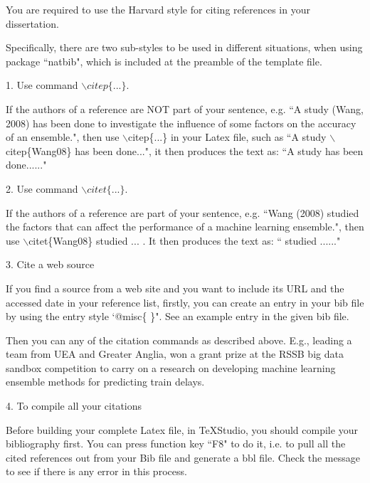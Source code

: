 You are required to use the Harvard style for citing references in your dissertation.

Specifically, there are two sub-styles to be used in different situations, when using package ``natbib", which is included at the preamble of the template file.

1. Use command $\backslash citep\{...\}$. 

If the authors of a reference are NOT part of your sentence, e.g. ``A study (Wang, 2008) has been done to investigate the influence of some factors on the accuracy of an ensemble.", then use $\backslash$citep\{...\} in your Latex file, such as ``A study $\backslash$citep\{Wang08\} has been done...", it then produces the text as: 
``A study \citep{Wang08} has been done......"

2. Use command $\backslash citet\{...\}$.

If the authors of a reference are part of your sentence, e.g. ``Wang (2008) studied the factors that can affect the performance of a machine learning ensemble.", then use $\backslash$citet\{Wang08\} studied ... . It then produces the text as: `` \citet{Wang08} studied ......" 

3. Cite a web source

If you find a source from a web site and you want to include its URL and the accessed date in your reference list, firstly, you can create an entry in your bib file by using the entry style  `@misc\{ \}". See an example entry in the given bib file.


Then you can any of the citation commands as described above. E.g.\citet{Wang_TrainDelayPrediction}, leading a team from UEA and Greater Anglia, won a grant prize at the RSSB big data sandbox competition to carry on a research on developing machine learning ensemble methods for predicting train delays. 

4. To compile all your citations

Before building your complete Latex file,  
in TeXStudio, you should compile your bibliography first. You can press function key ``F8"  to do it, i.e. to pull all the cited references out from your Bib file and generate a bbl file. Check the message to see if there is any error in this process.

